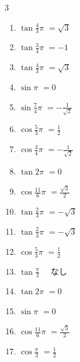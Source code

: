\begin{multicols}{3}
\begin{enumerate}
  \item $\displaystyle \tan{\frac{4}{3}\pi}$
        $\displaystyle =\sqrt{3}$

\columnbreak %

  \item $\displaystyle \tan{\frac{3}{4}\pi}$
        $\displaystyle =-1$

  \item $\displaystyle \tan{\frac{4}{3}\pi}$
        $\displaystyle =\sqrt{3}$

  \item $\displaystyle \sin{\pi}$
        $\displaystyle =0$

  \item $\displaystyle \sin{\frac{7}{4}\pi}$
        $\displaystyle =-\frac{1}{\sqrt{2}}$

  \item $\displaystyle \cos{\frac{5}{3}\pi}$
        $\displaystyle =\frac{1}{2}$

  \item $\displaystyle \cos{\frac{3}{4}\pi}$
        $\displaystyle =-\frac{1}{\sqrt{2}}$

  \item $\displaystyle \tan{2\pi}$
        $\displaystyle =0$

  \item $\displaystyle \cos{\frac{11}{6}\pi}$
        $\displaystyle =\frac{\sqrt{3}}{2}$

  \item $\displaystyle \tan{\frac{2}{3}\pi}$
        $\displaystyle =-\sqrt{3}$

  \item $\displaystyle \tan{\frac{2}{3}\pi}$
        $\displaystyle =-\sqrt{3}$

  \item $\displaystyle \cos{\frac{5}{3}\pi}$
        $\displaystyle =\frac{1}{2}$

  \item $\displaystyle \tan{\frac{\pi}{2}}$
        $\displaystyle \quad なし$

  \item $\displaystyle \tan{2\pi}$
        $\displaystyle =0$

  \item $\displaystyle \sin{\pi}$
        $\displaystyle =0$

  \item $\displaystyle \cos{\frac{11}{6}\pi}$
        $\displaystyle =\frac{\sqrt{3}}{2}$

  \item $\displaystyle \cos{\frac{\pi}{3}}$
        $\displaystyle =\frac{1}{2}$


\end{enumerate}
\end{multicols}
